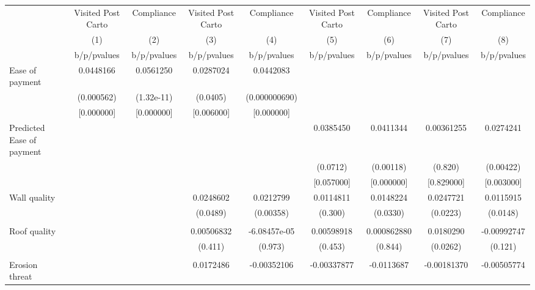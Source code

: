 {
\def\sym#1{\ifmmode^{#1}\else\(^{#1}\)\fi}
\begin{tabular}{l*{8}{c}}
\toprule
                &\multicolumn{1}{c}{Visited Post Carto}&\multicolumn{1}{c}{Compliance}&\multicolumn{1}{c}{Visited Post Carto}&\multicolumn{1}{c}{Compliance}&\multicolumn{1}{c}{Visited Post Carto}&\multicolumn{1}{c}{Compliance}&\multicolumn{1}{c}{Visited Post Carto}&\multicolumn{1}{c}{Compliance}\\
                &\multicolumn{1}{c}{(1)}&\multicolumn{1}{c}{(2)}&\multicolumn{1}{c}{(3)}&\multicolumn{1}{c}{(4)}&\multicolumn{1}{c}{(5)}&\multicolumn{1}{c}{(6)}&\multicolumn{1}{c}{(7)}&\multicolumn{1}{c}{(8)}\\
                &b/p/pvalues&b/p/pvalues&b/p/pvalues&b/p/pvalues&b/p/pvalues&b/p/pvalues&b/p/pvalues&b/p/pvalues\\
\midrule
Ease of payment &0.0448166&0.0561250&0.0287024&0.0442083&         &         &         &         \\
                &(0.000562)&(1.32e-11)& (0.0405)&(0.000000690)&         &         &         &         \\
                &[0.000000]&[0.000000]&[0.006000]&[0.000000]&         &         &         &         \\
Predicted Ease of payment&         &         &         &         &0.0385450&0.0411344&0.00361255&0.0274241\\
                &         &         &         &         & (0.0712)&(0.00118)&  (0.820)&(0.00422)\\
                &         &         &         &         &[0.057000]&[0.000000]&[0.829000]&[0.003000]\\
Wall quality    &         &         &0.0248602&0.0212799&0.0114811&0.0148224&0.0247721&0.0115915\\
                &         &         & (0.0489)&(0.00358)&  (0.300)& (0.0330)& (0.0223)& (0.0148)\\
                &         &         &         &         &         &         &         &         \\
Roof quality    &         &         &0.00506832&-6.08457e-05&0.00598918&0.000862880&0.0180290&-0.00992747\\
                &         &         &  (0.411)&  (0.973)&  (0.453)&  (0.844)& (0.0262)&  (0.121)\\
                &         &         &         &         &         &         &         &         \\
Erosion threat  &         &         &0.0172486&-0.00352106&-0.00337877&-0.0113687&-0.00181370&-0.00505774\\

\end{tabular}}
